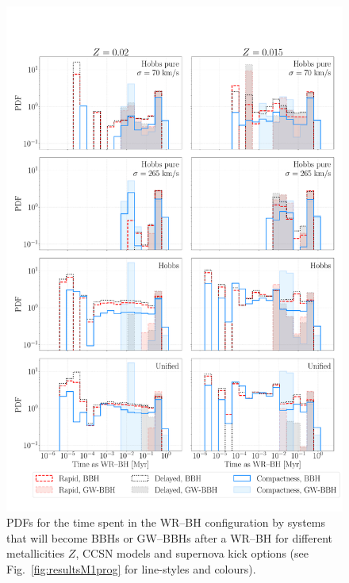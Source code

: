 \documentclass[a4paper,titlepage]{book}     	%
\begin{document}
\begin{figure}[h!]
	\centering
	\includegraphics[width=\textwidth]{./images/WRBHtime.pdf}	
	\caption{PDFs for the time spent in the WR--BH configuration by systems that will become BBHs or GW--BBHs after a WR--BH for different metallicities $Z$, CCSN models and supernova kick options (see Fig.\ \ref{fig:resultsM1prog} for line-styles and colours).}\label{fig:resultsWRBH-time}
\end{figure}
\end{document}
